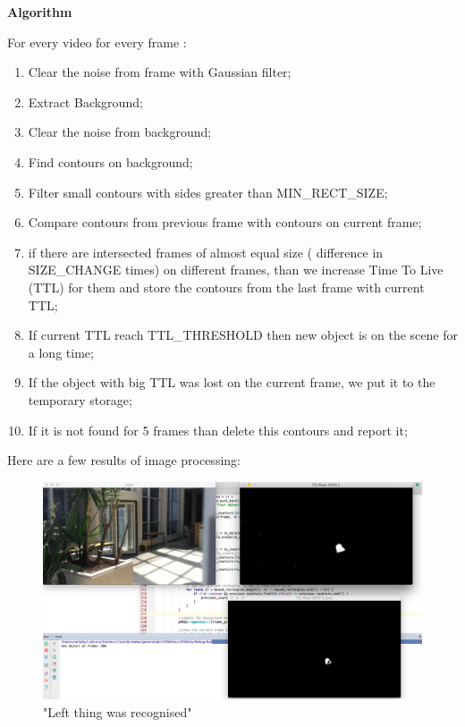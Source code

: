 \documentclass[12pt]{article}
\begin{document}
	\bigskip
	\textbf{Algorithm}
	
For every video for every frame :\\
	\begin{enumerate}
		\item Clear the noise from frame with Gaussian filter;
		\item Extract Background;
		\item Clear the noise from background;
		\item Find contours on background;
		\item Filter small contours with sides greater than MIN\_RECT\_SIZE;
		\item Compare contours from previous frame with contours on current frame;
		\item if there are intersected frames of almost equal size ( difference in SIZE\_CHANGE times) on different frames, than we increase Time To Live (TTL) for them and store the contours from the last frame with current TTL;
		\item If current TTL reach TTL\_THRESHOLD then new object is on the scene for a long time;
		\item If the object with big TTL was lost on the current frame, we put it to the temporary storage;
		\item If it is not found for 5 frames than delete this contours and report it;
	\end{enumerate}
	
	Here are a few results of image processing:\\
	
	\begin{figure}[H]
		\centering
		\includegraphics[width=15cm]{1}
		\caption{"Left thing was recognised"}
	\end{figure}
	
\end{document}
